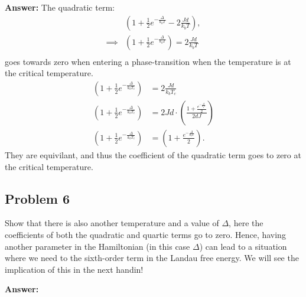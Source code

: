 \documentclass[a4paper]{article}
\newcommand{\newparagraph}{\vspace{.5cm}\noindent}
\begin{document}
\newparagraph
\textbf{Answer:} The quadratic term:
\begin{align*}
    &\left(1 + \frac{1}{2}e^{-\frac{\Delta}{k_bT}} - 2\frac{Jd}{k_bT}\right),\\
    \implies &\left(1 + \frac{1}{2}e^{-\frac{\Delta}{k_bT}}\right) = 2\frac{Jd}{k_bT}\\
\end{align*}goes towards zero when entering a phase-transition when the temperature is at the critical temperature. 
\begin{align*}
    \left(1 + \frac{1}{2}e^{-\frac{\Delta}{k_bT_c}}\right) &= 2\frac{Jd}{k_bT_c}\\
    \left(1 + \frac{1}{2}e^{-\frac{\Delta}{k_bT_c}}\right) &= 2Jd\cdot\left(\frac{1 + \frac{e^{-\frac{\Delta}{k_bT}}}{2}}{2dJ}\right)\\
    \left(1 + \frac{1}{2}e^{-\frac{\Delta}{k_bT_c}}\right) &= \left(1 + \frac{e^{-\frac{\Delta}{k_bT}}}{2}\right).
\end{align*}They are equivilant, and thus the coefficient of the quadratic term goes to zero at the critical temperature.

\subsection*{Problem 6}
Show that there is also another temperature and a value of $\Delta$, here the coefficients of both the quadratic and quartic terms go to zero.
Hence, having another parameter in the Hamiltonian (in this case $\Delta$) can lead to a situation where we need to the sixth-order term in the Landau free energy.
We will see the implication of this in the next handin!

\newparagraph
\textbf{Answer:}
\end{document}
